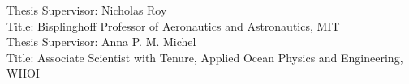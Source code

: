\begin{singlespace}
        \noindent Thesis Supervisor: Nicholas Roy \\
        \noindent Title: Bisplinghoff Professor of Aeronautics and Astronautics, MIT \\

        \noindent Thesis Supervisor: Anna P. M. Michel \\
        \noindent Title: Associate Scientist with Tenure, Applied Ocean Physics and Engineering, WHOI

    \end{singlespace}
    
    \newpage
    \null
    \thispagestyle{empty}
    \newpage

